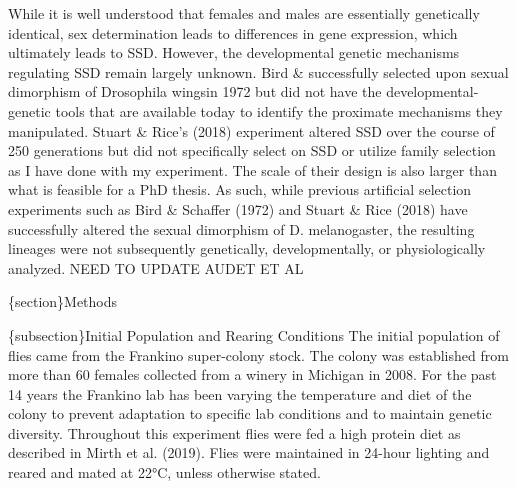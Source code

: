 \documentclass[
  11pt,
]{article}
\author{}
\date{\vspace{-2.5em}}
\begin{document}
\raggedright

\setlength{\parindent}{24pt}

While it is well understood that females and males are essentially
genetically identical, sex determination leads to differences in gene
expression, which ultimately leads to SSD. However, the developmental
genetic mechanisms regulating SSD remain largely unknown. Bird \&
successfully selected upon sexual dimorphism of Drosophila wingsin 1972 but did not have the
developmental-genetic tools that are available today to identify the
proximate mechanisms they manipulated. Stuart \& Rice's (2018)
experiment altered SSD over the course of 250 generations but did not
specifically select on SSD or utilize family selection as I have done
with my experiment. The scale of their design is also larger than what is feasible for a PhD thesis. As such, while
previous artificial selection experiments such as Bird \& Schaffer (1972)
and Stuart \& Rice (2018) have successfully altered the sexual
dimorphism of D. melanogaster, the resulting lineages were not
subsequently genetically, developmentally, or physiologically analyzed. NEED TO UPDATE AUDET ET AL

\{section\}Methods

\{subsection\}Initial Population and Rearing Conditions 
The initial
population of flies came from the Frankino super-colony stock. The
colony was established from more than 60 females collected from a
winery in Michigan in 2008. For the past 14 years the Frankino lab
has been varying the temperature and diet of the colony to prevent
adaptation to specific lab conditions and to maintain genetic diversity.
Throughout this experiment flies were fed a high protein diet as
described in Mirth et al. (2019). Flies were maintained in 24-hour
lighting and reared and mated at 22\si{\celsius}, unless otherwise
stated. 
\end{document}
